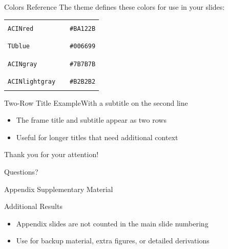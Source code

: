 \documentclass[aspectratio=169]{beamer}
\begin{document}
\begin{frame}{Colors Reference}
  The theme defines these colors for use in your slides:

  \vspace{4mm}
  \begin{tabular}{lll}
    \texttt{ACINred}       & {\color{ACINred}\rule{2cm}{4mm}}       & \texttt{\#BA122B} \\[3pt]
    \texttt{TUblue}        & {\color{TUblue}\rule{2cm}{4mm}}        & \texttt{\#006699} \\[3pt]
    \texttt{ACINgray}      & {\color{ACINgray}\rule{2cm}{4mm}}      & \texttt{\#7B7B7B} \\[3pt]
    \texttt{ACINlightgray} & {\color{ACINlightgray}\rule{2cm}{4mm}} & \texttt{\#B2B2B2} \\[3pt]
  \end{tabular}
\end{frame}

\begin{frame}{Two-Row Title Example}{With a subtitle on the second line}
  \begin{itemize}
    \item The frame title and subtitle appear as two rows
    \item Useful for longer titles that need additional context
  \end{itemize}
\end{frame}

\begin{frame}{}
  \vfill
  \centering
  {\Large\color{ACINgray} Thank you for your attention!}

  \vspace{6mm}
  {\small\color{ACINgray} Questions?}
  \vfill
\end{frame}

\appendix

\begin{frame}{Appendix}
  \centering
  \vfill
  {\large\color{ACINgray} Supplementary Material}
  \vfill
\end{frame}

\begin{frame}{Additional Results}
  \begin{itemize}
    \item Appendix slides are not counted in the main slide numbering
    \item Use for backup material, extra figures, or detailed derivations
  \end{itemize}
\end{frame}
\end{document}
